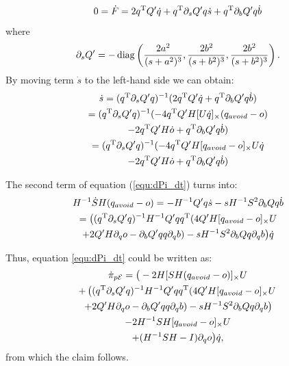 \documentclass[10pt,twocolumn,twoside]{IEEEtran}
\begin{document}
    \begin{equation}
      0=\dot F =  2q^\mathrm{T} Q' \dot q + q^\mathrm{T} \partial_s Q' q \dot s + q^\mathrm{T} \partial_bQ' q \dot b
    \end{equation}
    where
    \begin{equation}
      \partial_s Q'= -\operatorname{diag}\left(\frac{2a^2}{(s+a^2)^3},\frac{2b^2}{(s+b^2)^3},\frac{2b^2}{(s+b^2)^3}\right).
    \end{equation}
    By moving term $\dot s$ to the left-hand side we can obtain:
    \begin{multline}\label{equ:s_dot}
      \dot s =  (q^\mathrm{T} \partial_s Q' q)^{-1} (2q^\mathrm{T} Q' \dot q + q^\mathrm{T} \partial_b Q' q \dot b)\\
      =  (q^\mathrm{T} \partial_s Q' q)^{-1} (-4q^\mathrm{T} Q' H[U\dot q]_\times (q_{avoid} - o) \\
      -2q^\mathrm{T} Q'H\dot o + q^\mathrm{T} \partial_b Q' q \dot b)\\
      =  (q^\mathrm{T} \partial_s Q' q)^{-1} (-4q^\mathrm{T} Q' H[q_{avoid} - o]_\times U\dot q \\
      -2q^\mathrm{T} Q'H\dot o + q^\mathrm{T} \partial_b Q' q \dot b)
    \end{multline}

    The second term of equation (\ref{equ:dPi_dt}) turns into:
    \begin{multline}
      H^{-1}\dot S H (q_{avoid} - o)
      = - H^{-1} Q' q \dot s - s H^{-1} S^2 \partial_b Q q \dot b\\
      =   \big( (q^\mathrm{T} \partial_s Q' q)^{-1} H^{-1} Q' q q^\mathrm{T}  (4Q' H[q_{avoid} - o]_\times U  \\
      + 2Q' H\partial_q o - \partial_b Q' q q \partial_q b) -  s H^{-1} S^2 \partial_b Q q \partial_q b\big) \dot q\\
    \end{multline}

    Thus, equation \eqref{equ:dPi_dt} could be written as:
    \begin{multline}
      \dot \pi_{p\mathcal{E}} = \big(-2 H [ SH(q_{avoid}-o)]_{\times}U   \\
      + \left( (q^\mathrm{T} \partial_s Q' q)^{-1} H^{-1} Q' q q^\mathrm{T}  (4Q' H[q_{avoid} - o]_\times U \right. \\
      \left.+ 2Q' H\partial_q o - \partial_b Q' q q \partial_q b) -  s H^{-1} S^2 \partial_b Q q \partial_q b\right) \\
      -2H^{-1} S H[q_{avoid}-o]_{\times} U  \\
      + (H^{-1}SH -I)\partial_q o \big) \dot q,
    \end{multline}
    from which the claim follows.
  
\end{document}
